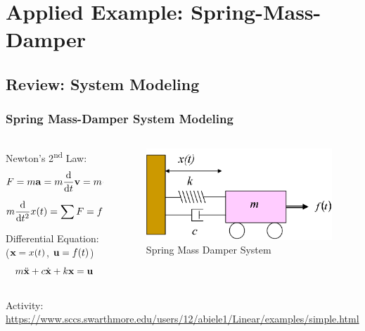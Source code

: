 \documentclass[aspectratio=169]{beamer}
\begin{document}
\begin{frame}
{\begin{columns}
\begin{column}{0.4\textwidth}
		\end{column}
	\end{columns}}
\end{frame}

\section{Applied Example: Spring-Mass-Damper}
\subsection{Review: System Modeling}
\begin{frame}
	\frametitle{Spring Mass-Damper System Modeling}
	\begin{columns}
		\begin{column}{0.5 \textwidth}
			Newton's 2\textsuperscript{nd} Law:
			\[
				F = m \vb{a} 
				= m \dv{t} \vb{v} 
				= m \dv{t} \qty(\dv{t} \vb{x})
			\]
			\pause
			\[
				m \dv{t^2} x(t) 
				= \sum F 
				= f(t) - b \dv{t} x(t) - k x(t)
			\] 
			\vspace{1em}

			\pause{}
			Differential Equation: ($\vb{x} = x(t)$, $\vb{u} = f(t)$)
			\[
				m \ddot{\vb{x}} + c \dot{\vb{x}} + k \vb{x} = \vb{u}
			\]
		\end{column}
		\begin{column}{0.375 \textwidth}
			\onslide<1->
			\begin{figure}
				\includegraphics[width=\textwidth]{Images/SpringMassDamper_cartSystem.png}
				Spring Mass Damper System \cite{ctms_engin_umich_SystemModeling}
			\end{figure}
		\end{column}
	\end{columns}
	
	\footnotesize{
		Activity: 
		\url{https://www.sccs.swarthmore.edu/users/12/abiele1/Linear/examples/simple.html}
	}
\end{frame}
\end{document}
